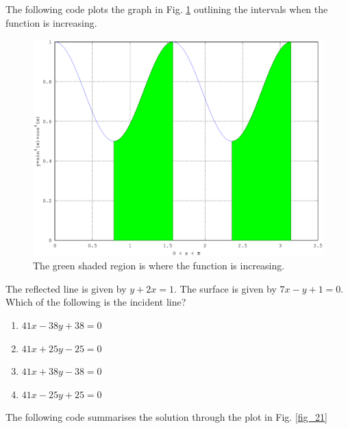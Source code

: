 \documentclass[journal,12pt,twocolumn]{IEEEtran}
\begin{document}
\solution The following code plots the graph in Fig. \ref{fig_20} outlining the intervals when the function is increasing.

%
\begin{figure}[h]
\centering
\includegraphics[width=\columnwidth]{./version_2/ee16b1020/ee16b1020}
\caption{ The green shaded region is where the function is increasing.}
\label{fig_20}	
\end{figure}
%
\begin{problem}
The reflected line is given by $y+2x=1$. The surface is given by $7x-y+1=0$. Which of the following is the incident line?
\begin{enumerate}
\item $41x - 38y +38 = 0$
\item $41x +25y - 25 = 0$
\item $41x + 38y-38=0$
\item $41x-25y+25=0$
\end{enumerate}
\end{problem}
\solution

The following code  summarises the solution through the plot in Fig. \ref{fig_21}

%
\end{document}
